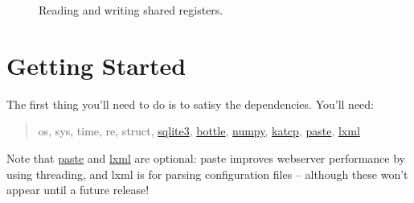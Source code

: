 \documentclass[letterpaper,10pt,english]{sphinxmanual}
\begin{document}
\begin{figure}[htbp]
\centering
\capstart

\caption{Reading and writing shared registers.}\end{figure}


\chapter{Getting Started}
\label{index:getting-started}
The first thing you'll need to do is to satisy the dependencies. You'll need:
\begin{quote}

os, sys, time, re, struct, \href{http://docs.python.org/library/sqlite3.html}{sqlite3}, \href{http://bottlepy.org/docs/dev/}{bottle}, \href{http://numpy.scipy.org/}{numpy}, \href{http://pypi.python.org/pypi/katcp/0.3.4}{katcp}, \href{http://pythonpaste.org/}{paste}, \href{http://lxml.de/}{lxml}
\end{quote}

Note that \href{http://pythonpaste.org/}{paste} and \href{http://lxml.de/}{lxml} are optional: paste improves webserver performance by using threading, and
lxml is for parsing configuration files -- although these won't appear until a future release!
\end{document}
